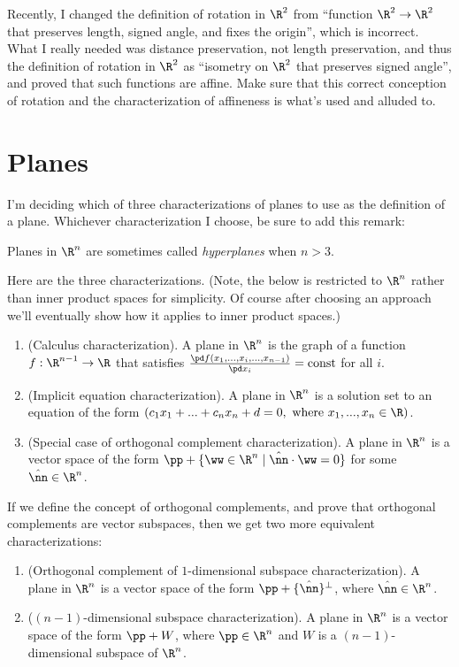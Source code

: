 Recently, I changed the definition of rotation in $\R^2$ from ``function $\R^2 \rightarrow \R^2$ that preserves length, signed angle, and fixes the origin'', which is incorrect. What I really needed was distance preservation, not length preservation, and thus the definition of rotation in $\R^2$ as ``isometry on $\R^2$ that preserves signed angle'', and proved that such functions are affine. Make sure that this correct conception of rotation and the characterization of affineness is what's used and alluded to.

\newpage

\section*{Planes}

I'm deciding which of three characterizations of planes to use as the definition of a plane. Whichever characterization I choose, be sure to add this remark:

\begin{center}
	Planes in $\R^n$ are sometimes called \textit{hyperplanes} when $n > 3$.
\end{center}

Here are the three characterizations. (Note, the below is restricted to $\R^n$ rather than inner product spaces for simplicity. Of course after choosing an approach we'll eventually show how it applies to inner product spaces.)

\begin{enumerate}
	\item (Calculus characterization). A plane in $\R^n$ is the graph of a function $f:\R^{n - 1} \rightarrow \R$ that satisfies $\frac{\pd f(x_1, ..., x_i, ..., x_{n - 1})}{\pd x_i} = \text{const}$ for all $i$.
	\item (Implicit equation characterization). A plane in $\R^n$ is a solution set to an equation of the form $(c_1 x_1 + ... + c_n x_n + d = 0, \text{ where $x_1, ..., x_n \in \R$})$.
	\item (Special case of orthogonal complement characterization). A plane in $\R^n$ is a vector space of the form $\pp + \{\ww \in \R^n \mid \hat{\nn} \cdot \ww = 0 \}$ for some $\hat{\nn} \in \R^n$.
\end{enumerate}

If we define the concept of orthogonal complements, and prove that orthogonal complements are vector subspaces, then we get two more equivalent characterizations:

\begin{enumerate}
	\item[4.1.] (Orthogonal complement of $1$-dimensional subspace characterization). A plane in $\R^n$ is a vector space of the form $\pp + \{\hat{\nn}\}^\perp$, where $\hat{\nn} \in \R^n$.
	\item[4.2.] ($(n - 1)$-dimensional subspace characterization). A plane in $\R^n$ is a vector space of the form $\pp + W$, where $\pp \in \R^n$ and $W$ is a $(n - 1)$-dimensional subspace of $\R^n$.
\end{enumerate}

